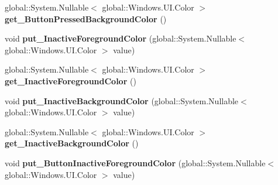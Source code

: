 \begin{DoxyCompactItemize}
\item 
\mbox{\label{class_windows_1_1_u_i_1_1_view_management_1_1_application_view_title_bar_af882393a152b9df371e3781f739cabac}} 
global\+::\+System.\+Nullable$<$ global\+::\+Windows.\+U\+I.\+Color $>$ {\bfseries get\+\_\+\+Button\+Pressed\+Background\+Color} ()
\item 
\mbox{\label{class_windows_1_1_u_i_1_1_view_management_1_1_application_view_title_bar_ab42ad105c4bc400b515275e8802c38ad}} 
void {\bfseries put\+\_\+\+Inactive\+Foreground\+Color} (global\+::\+System.\+Nullable$<$ global\+::\+Windows.\+U\+I.\+Color $>$ value)
\item 
\mbox{\label{class_windows_1_1_u_i_1_1_view_management_1_1_application_view_title_bar_a5258d150c16f577f11ca52e8b41ba734}} 
global\+::\+System.\+Nullable$<$ global\+::\+Windows.\+U\+I.\+Color $>$ {\bfseries get\+\_\+\+Inactive\+Foreground\+Color} ()
\item 
\mbox{\label{class_windows_1_1_u_i_1_1_view_management_1_1_application_view_title_bar_aa912163f22981533bcaf244d367a36e0}} 
void {\bfseries put\+\_\+\+Inactive\+Background\+Color} (global\+::\+System.\+Nullable$<$ global\+::\+Windows.\+U\+I.\+Color $>$ value)
\item 
\mbox{\label{class_windows_1_1_u_i_1_1_view_management_1_1_application_view_title_bar_aab1e5ef6e2bc37796640ab4cd4c4d182}} 
global\+::\+System.\+Nullable$<$ global\+::\+Windows.\+U\+I.\+Color $>$ {\bfseries get\+\_\+\+Inactive\+Background\+Color} ()
\item 
\mbox{\label{class_windows_1_1_u_i_1_1_view_management_1_1_application_view_title_bar_a24fc97928a847870e480f914ee47dfb5}} 
void {\bfseries put\+\_\+\+Button\+Inactive\+Foreground\+Color} (global\+::\+System.\+Nullable$<$ global\+::\+Windows.\+U\+I.\+Color $>$ value)
\item 
\mbox{\label{class_windows_1_1_u_i_1_1_view_management_1_1_application_view_title_bar_a4921101b9d4e1bf1aaadc876b4855657}} 

\end{DoxyCompactItemize}
